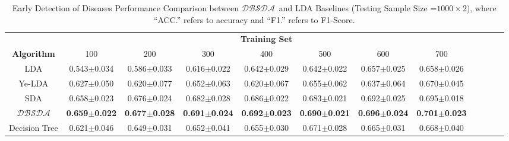 \documentclass{article}
\newcommand{\TheName}{$\mathcal{DBSDA}$}
\theoremstyle{plain}
\begin{document}
\begin{table*}
\caption{Early Detection of Diseases Performance Comparison between \TheName\ and LDA Baselines (Testing Sample Size =$1000\times 2$), where ``ACC.'' refers to accuracy and ``F1.'' refers to F1-Score.}
		\label{tab:table11}
\begin{center}
\scriptsize{
\begin{tabular}{*{12}{c}}
\toprule
    & \multicolumn{7}{c}{\textbf{Training Set}}\\
    \cmidrule(lr){2-8}
    \textbf{Algorithm}& 
    \multicolumn{1}{c}{100} &
    \multicolumn{1}{c}{200} &
    \multicolumn{1}{c}{300} &
    \multicolumn{1}{c}{400} &
     \multicolumn{1}{c}{500} &
     \multicolumn{1}{c}{600} &
     \multicolumn{1}{c}{700} \\




\cmidrule(lr){1-1}
\cmidrule(lr){2-2}
\cmidrule(lr){3-3}
\cmidrule(lr){4-4}
\cmidrule(lr){5-5}
\cmidrule(lr){6-6}
\cmidrule(lr){7-7}
\cmidrule(lr){8-8}
LDA&0.543$\pm$0.034&0.586$\pm$0.033&0.616$\pm$0.022&0.642$\pm$0.029&0.642$\pm$0.022&0.657$\pm$0.025&0.658$\pm$0.026\\

\cmidrule(lr){1-1}
\cmidrule(lr){2-2}
\cmidrule(lr){3-3}
\cmidrule(lr){4-4}
\cmidrule(lr){5-5}
\cmidrule(lr){6-6}
\cmidrule(lr){7-7}
\cmidrule(lr){8-8}
Ye-LDA&0.627$\pm$0.050&0.620$\pm$0.077&0.652$\pm$0.063&0.620$\pm$0.067&0.655$\pm$0.062&0.637$\pm$0.064&0.670$\pm$0.045\\

\cmidrule(lr){1-1}
\cmidrule(lr){2-2}
\cmidrule(lr){3-3}
\cmidrule(lr){4-4}
\cmidrule(lr){5-5}
\cmidrule(lr){6-6}
\cmidrule(lr){7-7}
\cmidrule(lr){8-8}
SDA&0.658$\pm$0.023&0.676$\pm$0.024&0.682$\pm$0.028&0.686$\pm$0.022&0.683$\pm$0.021&0.692$\pm$0.025&0.695$\pm$0.018\\


\cmidrule(lr){1-1}
\cmidrule(lr){2-2}
\cmidrule(lr){3-3}
\cmidrule(lr){4-4}
\cmidrule(lr){5-5}
\cmidrule(lr){6-6}
\cmidrule(lr){7-7}
\cmidrule(lr){8-8}
\textbf{\TheName} &\textbf{0.659$\pm$0.022}&\textbf{0.677$\pm$0.028}&\textbf{0.691$\pm$0.024}&\textbf{0.692$\pm$0.023}&\textbf{0.690$\pm$0.021}&\textbf{0.696$\pm$0.024}&\textbf{0.701$\pm$0.023}\\




\cmidrule(lr){1-1}
\cmidrule(lr){2-2}
\cmidrule(lr){3-3}
\cmidrule(lr){4-4}
\cmidrule(lr){5-5}
\cmidrule(lr){6-6}
\cmidrule(lr){7-7}
\cmidrule(lr){8-8}
Decision Tree&0.621$\pm$0.046&0.649$\pm$0.031&0.652$\pm$0.041&0.655$\pm$0.030&0.671$\pm$0.028&0.665$\pm$0.031&0.668$\pm$0.040\\


\end{tabular}}
\end{center}
\end{table*}
\end{document}
